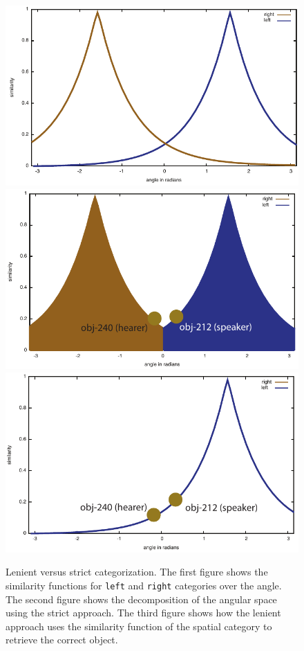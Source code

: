 \begin{figure}
\includegraphics[width=0.6\columnwidth]{figs/lenient-vs-strict-interpretation}\\
\includegraphics[width=0.6\columnwidth]{figs/lenient-vs-strict-interpretation-strict}\\
\includegraphics[width=0.6\columnwidth]{figs/lenient-vs-strict-interpretation-lenient}
\caption[Lenient vs strict categorization]{%
Lenient versus strict categorization.
The first figure shows 
the similarity functions for {\footnotesize\tt left} and {\footnotesize\tt right} 
categories over the angle. The second figure shows the decomposition
of the angular space using the strict approach. The third figure shows
how the lenient approach uses the similarity function of the spatial category
to retrieve the correct object.}
\label{f:lenient-vs-strict}
\end{figure}

